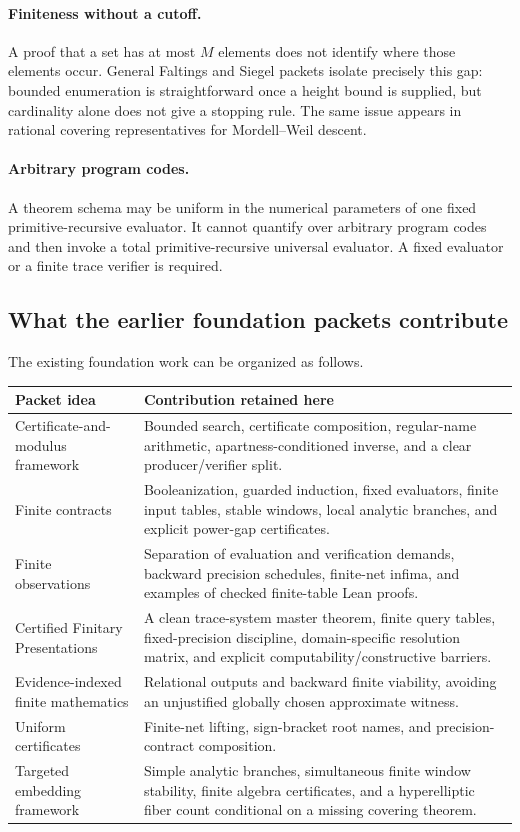 \paragraph{Finiteness without a cutoff.}
A proof that a set has at most \(M\) elements does not identify where those
elements occur.  General Faltings and Siegel packets isolate precisely this
gap: bounded enumeration is straightforward once a height bound is supplied,
but cardinality alone does not give a stopping rule.  The same issue appears
in rational covering representatives for Mordell--Weil descent.

\paragraph{Arbitrary program codes.}
A theorem schema may be uniform in the numerical parameters of one fixed
primitive-recursive evaluator.  It cannot quantify over arbitrary program
codes and then invoke a total primitive-recursive universal evaluator.  A
fixed evaluator or a finite trace verifier is required.

\subsection{What the earlier foundation packets contribute}

The existing foundation work can be organized as follows.

\begin{longtable}{@{}p{}p{}@{}}
\toprule
Packet idea & Contribution retained here \\
\midrule
\endhead
Certificate-and-modulus framework & Bounded search, certificate composition,
regular-name arithmetic, apartness-conditioned inverse, and a clear
producer/verifier split.\\
Finite contracts & Booleanization, guarded induction, fixed evaluators,
finite input tables, stable windows, local analytic branches, and explicit
power-gap certificates.\\
Finite observations & Separation of evaluation and verification demands,
backward precision schedules, finite-net infima, and examples of checked
finite-table Lean proofs.\\
Certified Finitary Presentations & A clean trace-system master theorem,
finite query tables, fixed-precision discipline, domain-specific resolution
matrix, and explicit computability/constructive barriers.\\
Evidence-indexed finite mathematics & Relational outputs and backward finite
viability, avoiding an unjustified globally chosen approximate witness.\\
Uniform certificates & Finite-net lifting, sign-bracket root names, and
precision-contract composition.\\
Targeted embedding framework & Simple analytic branches, simultaneous finite
window stability, finite algebra certificates, and a hyperelliptic fiber
count conditional on a missing covering theorem.\\
\bottomrule
\end{longtable}

